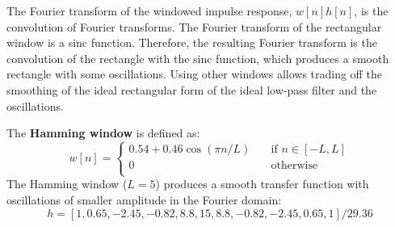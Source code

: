 The Fourier transform of the windowed impulse response, $w [n] h[n]$, is the convolution of Fourier transforms. The Fourier transform of the rectangular window is a sinc function. Therefore, the resulting Fourier transform is the convolution of the rectangle with the sinc function, which produces a smooth rectangle with some oscillations. Using other windows allows trading off the smoothing of the ideal rectangular form of the ideal low-pass filter and the oscillations.

The {\bf Hamming window} is defined as:
\begin{equation}
	w  \left[n\right] =  \begin{cases}
		0.54+0.46 \cos (\pi n/L) & \quad \text{if }  n \in  \left[-L, L\right] \\
		0                        & \quad \text{otherwise }                     \\
	\end{cases}
\end{equation}
The Hamming window ($L=5$) produces a smooth transfer function with oscillations of smaller amplitude in the Fourier domain:
\begin{equation}
	h = [1, 0.65, -2.45, -0.82, 8.8, 15, 8.8, -0.82, -2.45, 0.65, 1] / 29.36
\end{equation}

